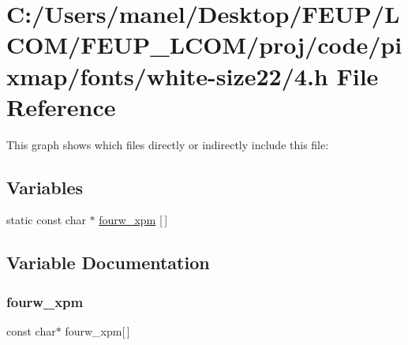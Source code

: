 \hypertarget{white-size22_24_8h}{}\section{C\+:/\+Users/manel/\+Desktop/\+F\+E\+U\+P/\+L\+C\+O\+M/\+F\+E\+U\+P\+\_\+\+L\+C\+O\+M/proj/code/pixmap/fonts/white-\/size22/4.h File Reference}
\label{white-size22_24_8h}
This graph shows which files directly or indirectly include this file\+:
\subsection*{Variables}
\begin{DoxyCompactItemize}
\item 
static const char $\ast$ \mbox{\hyperlink{white-size22_24_8h_ad60596e03394e96c18a47efc5a3ae507}{fourw\+\_\+xpm}} \mbox{[}$\,$\mbox{]}
\end{DoxyCompactItemize}


\subsection{Variable Documentation}
\mbox{\label{white-size22_24_8h_ad60596e03394e96c18a47efc5a3ae507}} 
\subsubsection{\texorpdfstring{fourw\_xpm}{fourw\_xpm}}
{\footnotesize\ttfamily const char$\ast$ fourw\+\_\+xpm\mbox{[}$\,$\mbox{]}\hspace{0.3cm}{\ttfamily [static]}}

